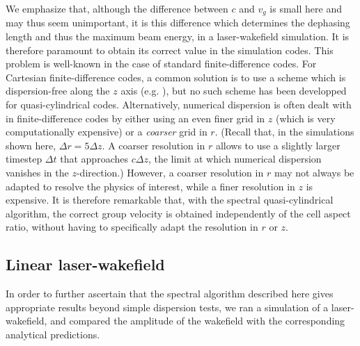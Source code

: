 \documentclass[1p,times,authoryear]{elsarticle}
\begin{document}
We emphasize that, although the difference between $c$ and $v_g$ is
small here and may thus seem unimportant, it is this difference which determines
the dephasing length and thus the
maximum beam energy, in a laser-wakefield simulation. It is therefore
paramount to obtain its correct value in the simulation codes. This
problem is well-known in the case of standard finite-difference
codes. For Cartesian finite-difference codes, a common solution is to
use a scheme which is dispersion-free along the $z$ axis 
(e.g. \citep{Karkkainen,Pukhov,Nuter}), but no such scheme has been
developped for quasi-cylindrical codes. Alternatively, numerical dispersion is often 
dealt with in finite-difference codes by either using an even finer grid in
$z$ (which is very computationally expensive) or
a \emph{coarser} grid in $r$. (Recall that, in the simulations shown here, $\Delta r = 5\Delta
z$. A coarser resolution in $r$ allows to
use a slightly larger timestep $\Delta t$ that approaches $c\Delta z$, the limit 
at which numerical dispersion vanishes in the $z$-direction.) 
However, a coarser resolution in $r$ may not always be
adapted to resolve the physics of interest, while a finer resolution in $z$ 
is expensive. It is therefore remarkable 
that, with the spectral quasi-cylindrical algorithm, the correct group
velocity is obtained independently of the cell aspect ratio, without having to 
specifically adapt the resolution in $r$ or $z$.

\subsection{Linear laser-wakefield}

In order to further ascertain that the spectral algorithm described here gives
appropriate results beyond simple dispersion tests, we ran a simulation of a laser-wakefield, and
compared the amplitude of the wakefield with the corresponding analytical predictions.
\end{document}
